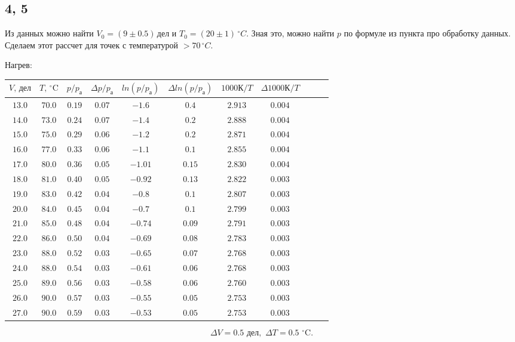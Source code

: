 \subsection*{4, 5}
Из данных можно найти $V_0=(9\pm0.5)\,\text{дел}$ и $T_0=(20\pm1)\,^\circ C$. Зная это, можно найти $p$ по формуле из пункта про обработку данных. Сделаем этот рассчет для точек с температурой $>70\,^\circ C$.

Нагрев:
\begin{center}
\begin{tabular}{|c|c|c|c|c|c|c|c|c|c|c|}\hline
$V,\,\text{дел}$&$T,\,^\circ\text{C}$&$p/p_\text{а}$&$\Delta p/p_\text{а}$
&$ln(p/p_\text{а})$&$\Delta ln(p/p_\text{а})$
&$1000\text{К}/T$&$\Delta 1000\text{К}/T$
\\ \hline
$13.0$&$70.0$&$0.19$&$0.07$&$-1.6$&$0.4$&$2.913$&$0.004$\\ \hline
$14.0$&$73.0$&$0.24$&$0.07$&$-1.4$&$0.2$&$2.888$&$0.004$\\ \hline
$15.0$&$75.0$&$0.29$&$0.06$&$-1.2$&$0.2$&$2.871$&$0.004$\\ \hline
$16.0$&$77.0$&$0.33$&$0.06$&$-1.1$&$0.1$&$2.855$&$0.004$\\ \hline
$17.0$&$80.0$&$0.36$&$0.05$&$-1.01$&$0.15$&$2.830$&$0.004$\\ \hline
$18.0$&$81.0$&$0.40$&$0.05$&$-0.92$&$0.13$&$2.822$&$0.003$\\ \hline
$19.0$&$83.0$&$0.42$&$0.04$&$-0.8$&$0.1$&$2.807$&$0.003$\\ \hline
$20.0$&$84.0$&$0.45$&$0.04$&$-0.7$&$0.1$&$2.799$&$0.003$\\ \hline
$21.0$&$85.0$&$0.48$&$0.04$&$-0.74$&$0.09$&$2.791$&$0.003$\\ \hline
$22.0$&$86.0$&$0.50$&$0.04$&$-0.69$&$0.08$&$2.783$&$0.003$\\ \hline
$23.0$&$88.0$&$0.52$&$0.03$&$-0.65$&$0.07$&$2.768$&$0.003$\\ \hline
$24.0$&$88.0$&$0.54$&$0.03$&$-0.61$&$0.06$&$2.768$&$0.003$\\ \hline
$25.0$&$89.0$&$0.56$&$0.03$&$-0.58$&$0.06$&$2.760$&$0.003$\\ \hline
$26.0$&$90.0$&$0.57$&$0.03$&$-0.55$&$0.05$&$2.753$&$0.003$\\ \hline
$27.0$&$90.0$&$0.59$&$0.03$&$-0.53$&$0.05$&$2.753$&$0.003$\\ \hline
\end{tabular}
\end{center}
$$\Delta V=0.5\,\,\text{дел},\,\,\Delta T=0.5\,\,^\circ\text{C}.$$

